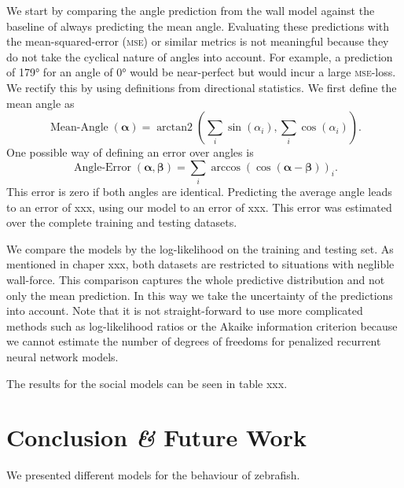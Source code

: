 \documentclass[nobib]{tufte-handout}
\begin{document}
We start by comparing the angle prediction from the wall model against the baseline of always predicting the mean angle.
Evaluating these predictions with the mean-squared-error (\textsc{mse}) or similar metrics is not meaningful because they do not take the cyclical nature of angles into account.
For example, a prediction of \ang{179} for an angle of \ang{0} would be near-perfect but would incur a large \textsc{mse}-loss.
We rectify this by using definitions from directional statistics\autocite{circularStatistics}.
We first define the mean angle as
\begin{equation*}
 \operatorname{Mean-Angle}(\bm{\alpha}) = \operatorname{arctan2} \left( \sum_i \sin \left( \alpha_i \right),  \sum_i \cos \left( \alpha_i \right)  \right).
\end{equation*}
One possible way of defining an error over angles is
\begin{equation*}
 \operatorname{Angle-Error}(\bm{\alpha}, \bm{\beta}) = \sum_i \operatorname{arccos} \left(  \cos  (\bm{\alpha} - \bm{\beta})  \right)_i.
\end{equation*}
This error is zero if both angles are identical.
Predicting the average angle leads to an error of xxx, using our model to an error of xxx.
This error was estimated over the complete training and testing datasets.

We compare the models by the log-likelihood on the training and testing set.
As mentioned in chaper xxx, both datasets are restricted to situations with neglible wall-force.
This comparison captures the whole predictive distribution and not only the mean prediction.
In this way we take the uncertainty of the predictions into account.
Note that it is not straight-forward to use more complicated methods such as log-likelihood ratios or the Akaike information criterion because we cannot estimate the number of degrees of freedoms for penalized recurrent neural network models.

The results for the social models can be seen in table xxx.


\section{Conclusion \textit{\&} Future Work}
We presented different models for the behaviour of zebrafish.
\end{document}
